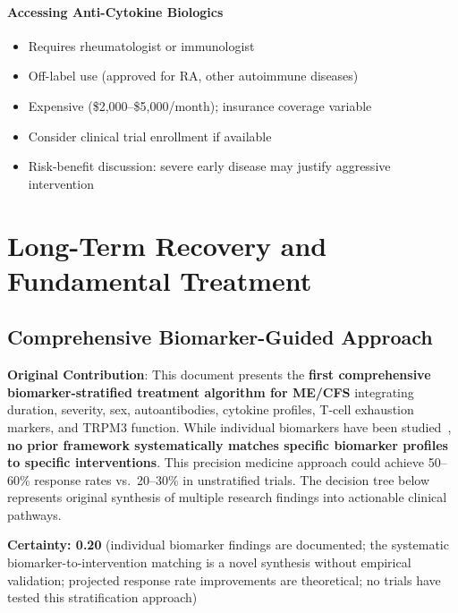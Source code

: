 \paragraph{Accessing Anti-Cytokine Biologics}
\begin{itemize}
    \item Requires rheumatologist or immunologist
    \item Off-label use (approved for RA, other autoimmune diseases)
    \item Expensive (\$2,000--\$5,000/month); insurance coverage variable
    \item Consider clinical trial enrollment if available
    \item Risk-benefit discussion: severe early disease may justify aggressive intervention
\end{itemize}

\section{Long-Term Recovery and Fundamental Treatment}
\label{sec:long-term-recovery}

\subsection{Comprehensive Biomarker-Guided Approach}

\begin{speculation}
\label{spec:precision-medicine-framework}
\textbf{Original Contribution}: This document presents the \textbf{first comprehensive biomarker-stratified treatment algorithm for ME/CFS} integrating duration, severity, sex, autoantibodies, cytokine profiles, T-cell exhaustion markers, and TRPM3 function. While individual biomarkers have been studied~\cite{Che2025,Hunter2025,Hornig2015,Sasso2026trpm3}, \textbf{no prior framework systematically matches specific biomarker profiles to specific interventions}. This precision medicine approach could achieve 50--60\% response rates vs.\ 20--30\% in unstratified trials. The decision tree below represents original synthesis of multiple research findings into actionable clinical pathways.

\textbf{Certainty: 0.20} (individual biomarker findings are documented; the systematic biomarker-to-intervention matching is a novel synthesis without empirical validation; projected response rate improvements are theoretical; no trials have tested this stratification approach)
\end{speculation}

